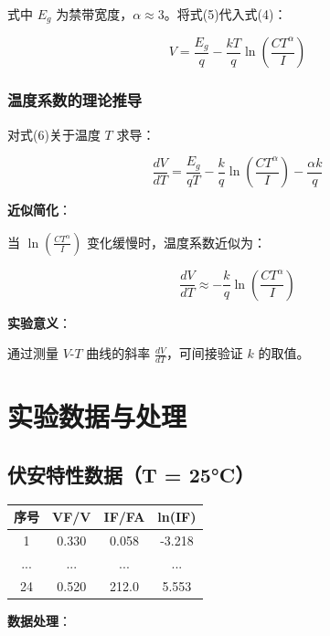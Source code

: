 \documentclass[12pt,a4paper]{article}
\begin{document}
式中 $E_g$ 为禁带宽度，$\alpha \approx 3$。将式(5)代入式(4)：

\begin{equation}
V = \frac{E_g}{q} - \frac{kT}{q} \ln \left( \frac{C T^{\alpha}}{I} \right) \tag{6}
\end{equation}

\subsubsection{温度系数的理论推导}

对式(6)关于温度 $T$ 求导：

\begin{equation}
\frac{dV}{dT} = \frac{E_g}{qT} - \frac{k}{q} \ln \left( \frac{C T^{\alpha}}{I} \right) - \frac{\alpha k}{q}
\end{equation}

\textbf{近似简化}：

当 $\ln \left( \frac{C T^{\alpha}}{I} \right)$ 变化缓慢时，温度系数近似为：

\begin{equation}
\frac{dV}{dT} \approx -\frac{k}{q} \ln \left( \frac{C T^{\alpha}}{I} \right) \tag{7}
\end{equation}

\textbf{实验意义}：

通过测量 $V$-$T$ 曲线的斜率 $\frac{dV}{dT}$，可间接验证 $k$ 的取值。

\section{实验数据与处理}

\subsection{伏安特性数据（T = 25°C）}

\begin{table}[H]
\centering
\begin{tabular}{|c|c|c|c|}
\hline
序号 & VF/V & IF/FA & ln(IF) \\
\hline
1 & 0.330 & 0.058 & -3.218 \\
\hline
... & ... & ... & ... \\
\hline
24 & 0.520 & 212.0 & 5.553 \\
\hline
\end{tabular}
\end{table}

\textbf{数据处理}：
\end{document}
